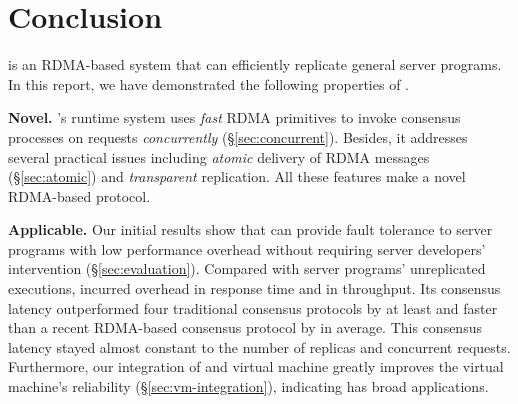 \section{Conclusion} \label{sec:conclusion}

\xxx is an RDMA-based \paxos system that can efficiently replicate general 
server programs. In this report, we have demonstrated the following properties 
of \xxx.

\textbf{Novel.} \xxx's runtime system uses \emph{fast} RDMA primitives to 
invoke consensus processes on requests \emph{concurrently} 
(\S\ref{sec:concurrent}). Besides, it addresses several practical issues 
including \emph{atomic} delivery of RDMA messages (\S\ref{sec:atomic}) and  
\emph{transparent} replication. All these features make \xxx a novel RDMA-based 
\paxos protocol.

\textbf{Applicable.} Our initial results show that \xxx can provide fault 
tolerance to server programs with low performance overhead without requiring 
server developers' intervention (\S\ref{sec:evaluation}). Compared with \nprog 
server programs' unreplicated executions, \xxx incurred \latencyoverhead 
overhead in response time and \tputoverhead in throughput. Its consensus 
latency outperformed four traditional consensus protocols by at least 
\comptradlow and faster than a recent RDMA-based consensus protocol \dare by 
\fasterDARE in average. This consensus latency stayed almost constant to the 
number of replicas and concurrent requests. Furthermore, our integration of 
\xxx and virtual machine greatly improves the virtual machine's reliability 
(\S\ref{sec:vm-integration}), indicating \xxx has broad applications.
